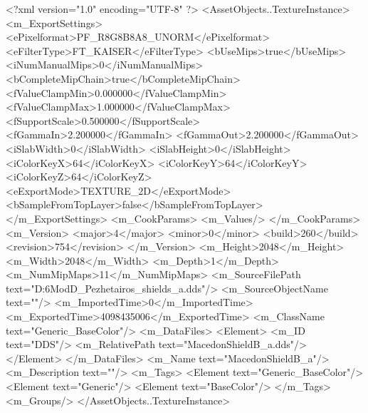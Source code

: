 <?xml version="1.0" encoding="UTF-8" ?>
<AssetObjects..TextureInstance>
	<m_ExportSettings>
		<ePixelformat>PF_R8G8B8A8_UNORM</ePixelformat>
		<eFilterType>FT_KAISER</eFilterType>
		<bUseMips>true</bUseMips>
		<iNumManualMips>0</iNumManualMips>
		<bCompleteMipChain>true</bCompleteMipChain>
		<fValueClampMin>0.000000</fValueClampMin>
		<fValueClampMax>1.000000</fValueClampMax>
		<fSupportScale>0.500000</fSupportScale>
		<fGammaIn>2.200000</fGammaIn>
		<fGammaOut>2.200000</fGammaOut>
		<iSlabWidth>0</iSlabWidth>
		<iSlabHeight>0</iSlabHeight>
		<iColorKeyX>64</iColorKeyX>
		<iColorKeyY>64</iColorKeyY>
		<iColorKeyZ>64</iColorKeyZ>
		<eExportMode>TEXTURE_2D</eExportMode>
		<bSampleFromTopLayer>false</bSampleFromTopLayer>
	</m_ExportSettings>
	<m_CookParams>
		<m_Values/>
	</m_CookParams>
	<m_Version>
		<major>4</major>
		<minor>0</minor>
		<build>260</build>
		<revision>754</revision>
	</m_Version>
	<m_Height>2048</m_Height>
	<m_Width>2048</m_Width>
	<m_Depth>1</m_Depth>
	<m_NumMipMaps>11</m_NumMipMaps>
	<m_SourceFilePath text="D:\Civ6Mod\3D\Macedon_Pezhetairos\makedon_shields\resaved\MacedonShieldB_a.dds"/>
	<m_SourceObjectName text=""/>
	<m_ImportedTime>0</m_ImportedTime>
	<m_ExportedTime>4098435006</m_ExportedTime>
	<m_ClassName text="Generic_BaseColor"/>
	<m_DataFiles>
		<Element>
			<m_ID text="DDS"/>
			<m_RelativePath text="MacedonShieldB_a.dds"/>
		</Element>
	</m_DataFiles>
	<m_Name text="MacedonShieldB_a"/>
	<m_Description text=""/>
	<m_Tags>
		<Element text="Generic_BaseColor"/>
		<Element text="Generic"/>
		<Element text="BaseColor"/>
	</m_Tags>
	<m_Groups/>
</AssetObjects..TextureInstance>

 